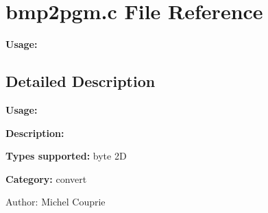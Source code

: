\section{bmp2pgm.c File Reference}
\label{bmp2pgm_8c}
{\bf Usage:} 



\subsection{Detailed Description}
{\bf Usage:} 

{\bf Description:}

{\bf Types supported:} byte 2D

{\bf Category:} convert

\begin{Desc}
\item[Author:]Michel Couprie \end{Desc}
